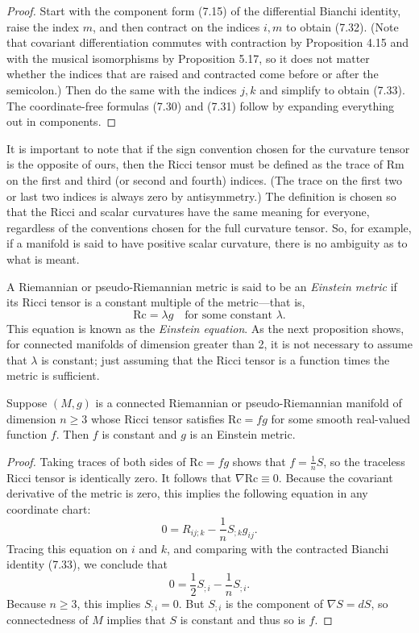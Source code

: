 \begin{proof}
Start with the component form (7.15) of the differential Bianchi identity, raise the index $m$, and then contract on the indices $i,m$ to obtain (7.32). (Note that covariant differentiation commutes with contraction by Proposition 4.15 and with the musical isomorphisms by Proposition 5.17, so it does not matter whether the indices that are raised and contracted come before or after the semicolon.) Then do the same with the indices $j, k$ and simplify to obtain (7.33). The coordinate-free formulas (7.30) and (7.31) follow by expanding everything out in components.
\end{proof}

It is important to note that if the sign convention chosen for the curvature tensor is the opposite of ours, then the Ricci tensor must be defined as the trace of $\mathrm{Rm}$ on the first and third (or second and fourth) indices. (The trace on the first two or last two indices is always zero by antisymmetry.) The definition is chosen so that the Ricci and scalar curvatures have the same meaning for everyone, regardless of the conventions chosen for the full curvature tensor. So, for example, if a manifold is said to have positive scalar curvature, there is no ambiguity as to what is meant.

A Riemannian or pseudo-Riemannian metric is said to be an \emph{Einstein metric} if its Ricci tensor is a constant multiple of the metric---that is,
\begin{equation}
\mathrm{Rc} = \lambda g \quad \text{for some constant } \lambda.
\tag{7.34}
\end{equation}
This equation is known as the \emph{Einstein equation}. As the next proposition shows, for connected manifolds of dimension greater than 2, it is not necessary to assume that $\lambda$ is constant; just assuming that the Ricci tensor is a function times the metric is sufficient.

\begin{proposition}
\label{prop:schur-lemma}
Suppose $(M,g)$ is a connected Riemannian or pseudo-Riemannian manifold of dimension $n \geq 3$ whose Ricci tensor satisfies $\mathrm{Rc} = fg$ for some smooth real-valued function $f$. Then $f$ is constant and $g$ is an Einstein metric.
\end{proposition}

\begin{proof}
Taking traces of both sides of $\mathrm{Rc} = fg$ shows that $f = \frac{1}{n}S$, so the traceless Ricci tensor is identically zero. It follows that $\nabla \mathrm{Rc} \equiv 0$. Because the covariant derivative of the metric is zero, this implies the following equation in any coordinate chart:
\[
0 = R_{ij;k} - \frac{1}{n}S_{;k}g_{ij}.
\]
Tracing this equation on $i$ and $k$, and comparing with the contracted Bianchi identity (7.33), we conclude that
\[
0 = \frac{1}{2}S_{;i} - \frac{1}{n}S_{;i}.
\]
Because $n \geq 3$, this implies $S_{;i} = 0$. But $S_{;i}$ is the component of $\nabla S = dS$, so connectedness of $M$ implies that $S$ is constant and thus so is $f$.
\end{proof}

